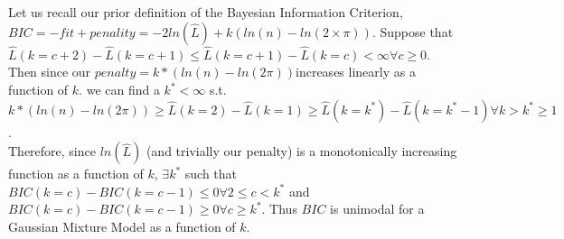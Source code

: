 \documentclass{article}
\begin{document}
Let us recall our prior definition of the Bayesian Information Criterion,  \(BIC = -fit + penality = -2ln(\hat{L}) + k(ln(n) - ln(2 \times\pi))\). Suppose that \(\hat{L}(k = c+2) - \hat{L}(k = c +1) \leq \hat{L}(k = c+1) - \hat{L}(k = c) < \infty \forall c \geq 0\).  \\Then since our \(penalty = k*(ln(n) - ln(2\pi))\)increases linearly as a function of \(k\). we can find a \(k^* < \infty\) s.t. \(k*(ln(n) - ln(2\pi)) \geq \hat{L}(k=2) - \hat{L}(k=1) \geq \hat{L}(k=k^*) - \hat{L}(k=k^* - 1) \forall k > k^*\geq 1\). \\Therefore, since \(ln(\hat{L})\) (and trivially our penalty) is a monotonically increasing function as a function of \(k\), \(\exists k^*\) such that \(BIC(k = c) - BIC(k = c-1) \leq 0 \forall 2 \leq c < k^{*}\) and   \(BIC(k = c) - BIC(k = c-1) \geq 0 \forall c \geq k^{*}\). Thus \(BIC\) is unimodal for a Gaussian Mixture Model as a function of \(k\).
\end{document}

